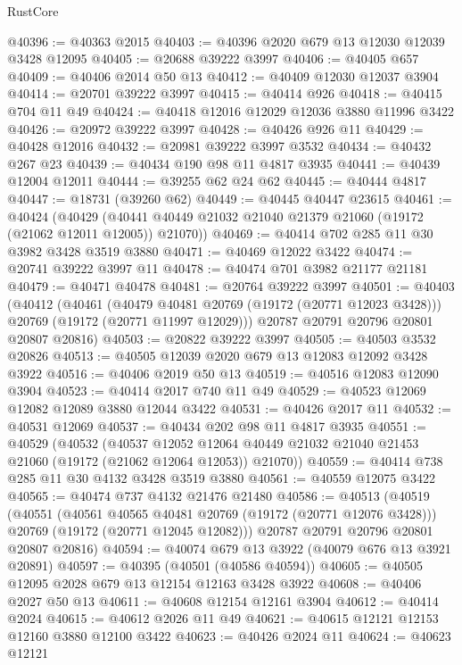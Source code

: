 \begin{lexlean}{RustCore}
\begin{coremodule}
@40396 := @40363 @2015
@40403 := @40396 @2020 @679 @13 @12030 @12039 @3428 @12095
@40405 := @20688 @39222 @3997
@40406 := @40405 @657
@40409 := @40406 @2014 @50 @13
@40412 := @40409 @12030 @12037 @3904
@40414 := @20701 @39222 @3997
@40415 := @40414 @926
@40418 := @40415 @704 @11 @49
@40424 := @40418 @12016 @12029 @12036 @3880 @11996 @3422
@40426 := @20972 @39222 @3997
@40428 := @40426 @926 @11
@40429 := @40428 @12016
@40432 := @20981 @39222 @3997 @3532
@40434 := @40432 @267 @23
@40439 := @40434 @190 @98 @11 @4817 @3935
@40441 := @40439 @12004 @12011
@40444 := @39255 @62 @24 @62
@40445 := @40444 @4817
@40447 := @18731 (@39260 @62)
@40449 := @40445 @40447 @23615
@40461 := @40424
    (@40429 (@40441 @40449 @21032 @21040 @21379 @21060 (@19172 (@21062 @12011 @12005)) @21070))
@40469 := @40414 @702 @285 @11 @30 @3982 @3428 @3519 @3880
@40471 := @40469 @12022 @3422
@40474 := @20741 @39222 @3997 @11
@40478 := @40474 @701 @3982 @21177 @21181
@40479 := @40471 @40478
@40481 := @20764 @39222 @3997
@40501 := @40403
    (@40412
      (@40461
        (@40479 @40481 @20769 (@19172 (@20771 @12023 @3428)))
        @20769
        (@19172 (@20771 @11997 @12029)))
      @20787
      @20791
      @20796
      @20801
      @20807
      @20816)
@40503 := @20822 @39222 @3997
@40505 := @40503 @3532 @20826
@40513 := @40505 @12039 @2020 @679 @13 @12083 @12092 @3428 @3922
@40516 := @40406 @2019 @50 @13
@40519 := @40516 @12083 @12090 @3904
@40523 := @40414 @2017 @740 @11 @49
@40529 := @40523 @12069 @12082 @12089 @3880 @12044 @3422
@40531 := @40426 @2017 @11
@40532 := @40531 @12069
@40537 := @40434 @202 @98 @11 @4817 @3935
@40551 := @40529
    (@40532
      (@40537
        @12052
        @12064
        @40449
        @21032
        @21040
        @21453
        @21060
        (@19172 (@21062 @12064 @12053))
        @21070))
@40559 := @40414 @738 @285 @11 @30 @4132 @3428 @3519 @3880
@40561 := @40559 @12075 @3422
@40565 := @40474 @737 @4132 @21476 @21480
@40586 := @40513
    (@40519
      (@40551
        (@40561 @40565 @40481 @20769 (@19172 (@20771 @12076 @3428)))
        @20769
        (@19172 (@20771 @12045 @12082)))
      @20787
      @20791
      @20796
      @20801
      @20807
      @20816)
@40594 := @40074 @679 @13 @3922 (@40079 @676 @13 @3921 @20891)
@40597 := @40395 (@40501 (@40586 @40594))
@40605 := @40505 @12095 @2028 @679 @13 @12154 @12163 @3428 @3922
@40608 := @40406 @2027 @50 @13
@40611 := @40608 @12154 @12161 @3904
@40612 := @40414 @2024
@40615 := @40612 @2026 @11 @49
@40621 := @40615 @12121 @12153 @12160 @3880 @12100 @3422
@40623 := @40426 @2024 @11
@40624 := @40623 @12121

\end{coremodule}
\end{lexlean}
